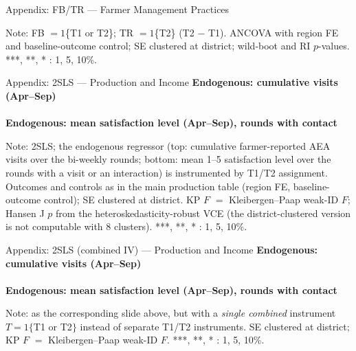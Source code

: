 \documentclass[aspectratio=169]{beamer}
\newcommand{\notefont}{\fontsize{5pt}{6pt}\selectfont}
\begin{document}
\begin{frame}{Appendix: FB/TR --- Farmer Management Practices}
	\centering
	\begin{minipage}{0.94\textwidth}
		\notefont
		Note: FB $=1$\{T1 or T2\}; TR $=1$\{T2\} (T2 $-$ T1). ANCOVA with region FE and
		baseline-outcome control; SE clustered at district; wild-boot and RI $p$-values.
		***, **, * : 1, 5, 10\%.
	\end{minipage}
\end{frame}




\begin{frame}{Appendix: 2SLS --- Production and Income}
	\centering
	{\notefont\textbf{Endogenous: cumulative visits (Apr--Sep)}}\\[1pt]
	\\[4pt]
	{\notefont\textbf{Endogenous: mean satisfaction level (Apr--Sep), rounds with contact}}\\[1pt]
	\begin{minipage}{0.94\textwidth}
		\notefont
		Note: 2SLS; the endogenous regressor (top: cumulative farmer-reported AEA visits
		over the bi-weekly rounds; bottom: mean 1--5 satisfaction level over the rounds with a visit or an interaction) is
		instrumented by T1/T2 assignment. Outcomes and controls as in the main production table
		(region FE, baseline-outcome control); SE clustered at district. KP $F$ $=$
		Kleibergen--Paap weak-ID $F$; Hansen J $p$ from the heteroskedasticity-robust VCE (the
		district-clustered version is not computable with 8 clusters).
		***, **, * : 1, 5, 10\%.
	\end{minipage}
\end{frame}

\begin{frame}{Appendix: 2SLS (combined IV) --- Production and Income}
	\centering
	{\notefont\textbf{Endogenous: cumulative visits (Apr--Sep)}}\\[1pt]
	\\[4pt]
	{\notefont\textbf{Endogenous: mean satisfaction level (Apr--Sep), rounds with contact}}\\[1pt]
	\begin{minipage}{0.94\textwidth}
		\notefont
		Note: as the corresponding slide above, but with a \emph{single combined}
		instrument $T = 1\{$T1 or T2$\}$ instead of separate T1/T2 instruments. SE clustered at
		district; KP $F$ $=$ Kleibergen--Paap weak-ID $F$. ***, **, * : 1, 5, 10\%.
	\end{minipage}
\end{frame}
\end{document}
